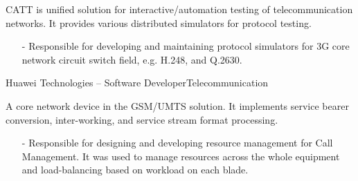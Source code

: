 \documentclass[11pt,a4paper]{moderncv}
\begin{document}
\vspace*{0.2\baselineskip}
{
  CATT is unified solution for interactive/automation testing of telecommunication networks. It provides various distributed simulators for protocol testing.
  \begin{itemize}
    \item[-] Responsible for developing and maintaining protocol simulators for 3G core network circuit switch field, e.g. H.248, and Q.2630.
  \end{itemize}
}
\pagebreak
\vspace*{0.2\baselineskip}
\vspace*{0.2\baselineskip}
{Huawei Technologies -- Software Developer}{Telecommunication}{}{}{}

{
  A core network device in the GSM/UMTS solution. It implements service bearer conversion, inter-working,  and service stream format processing.
  \begin{itemize}
    \item[-] Responsible for designing and developing resource management for Call Management. It was used to manage resources across the whole equipment and load-balancing based on workload on each blade.
  \end{itemize}
}


\end{document}
